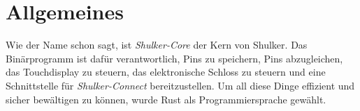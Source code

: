 \chapter{Allgemeines}
Wie der Name schon sagt, ist \textit{Shulker-Core} der Kern von Shulker. Das Binärprogramm ist dafür verantwortlich,
Pins zu speichern, Pins abzugleichen, das Touchdisplay zu steuern, das elektronische Schloss zu steuern und eine Schnittstelle
für \textit{Shulker-Connect} bereitzustellen. Um all diese Dinge effizient und sicher bewältigen zu können, wurde Rust als
Programmiersprache gewählt.